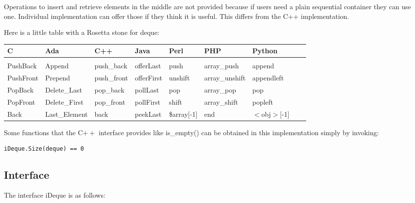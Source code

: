 \documentclass[12pt,a4paper,openany]{memoir} %
\begin{document}
{{Operations to insert and retrieve elements in the middle are not provided because if users need a plain sequential container they can use one. Individual implementation can offer those if they think it is useful. This differs from the C++ implementation.

Here is a little table with a Rosetta stone for deque:
\par
\noindent
{\footnotesize
\begin{tabular} {l l l l l l l l l}
C & Ada & C++ & Java & Perl & PHP & Python 
\\
\hline
\\
PushBack & Append & push\_back & offerLast & push & array\_push & append 
\\
PushFront & Prepend & push\_front & offerFirst & unshift & array\_unshift & appendleft 
\\
PopBack & Delete\_Last & pop\_back & pollLast & pop & array\_pop & pop 
\\
PopFront & Delete\_First & pop\_front & pollFirst & shift & array\_shift & popleft 
\\
Back & Last\_Element & back & peekLast & \$array[-1] & end & $<$obj$>$[-1]  
\end{tabular}
}
\par
Some functions that the C$++$ interface provides like is\_empty() can be obtained in this implementation simply by invoking:
\begin{verbatim}
iDeque.Size(deque) == 0
\end{verbatim}
\subsection{Interface}
The interface iDeque is as follows:


}}
\end{document}
